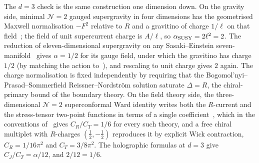 The $d = 3$ check is the same construction one dimension down. On
the gravity side, minimal $\mathcal{N} = 2$ gauged supergravity in four
dimensions has the geometrised Maxwell normalisation $-F^2$ relative to
$R$ and a gravitino of charge $1/\ell$ on that field~\cite{Caldarelli:1998hg};
the field of unit supercurrent charge is $A/\ell$, so
$\alpha_{\rm SUSY} = 2\ell^2 = 2$. The reduction of eleven-dimensional
supergravity on any Sasaki--Einstein seven-manifold~\cite{Gauntlett:2007ma}
gives $\alpha = 1/2$ for its gauge field, under which the gravitino has
charge $1/2$ (by matching the action to~\cite{Caldarelli:1998hg}), and rescaling to unit charge gives $2$ again. The charge
normalisation is fixed independently by requiring that the
Bogomol'nyi--Prasad--Sommerfield Reissner--Nordström solution saturate
$\Delta = R$, the chiral-primary bound of the boundary theory. On the field
theory side, the three-dimensional $\mathcal{N} = 2$ superconformal Ward
identity writes both the $R$-current and the stress-tensor two-point
functions in terms of a single coefficient~\cite{Closset:2012ru},
which in the conventions of~\cite{Osborn:1993cr} gives $C_R/C_T = 1/6$ for
every such theory, and a free chiral multiplet with $R$-charges
$(\tfrac12, -\tfrac12)$ reproduces it by explicit Wick contraction,
$C_R = 1/16\pi^2$ and $C_T = 3/8\pi^2$. The holographic formulas at
$d = 3$ give $C_J/C_T = \alpha/12$, and $2/12 = 1/6$.
